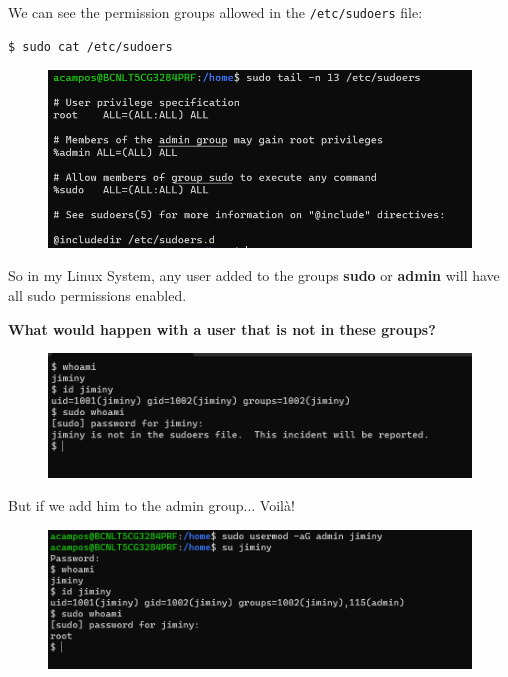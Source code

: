 \documentclass{article}
\newenvironment{codetemplate}[1][]{%
  \mybasecolorbox[#1]
  \itshape
}{%
  \endmybasecolorbox
}
\begin{document}
We can see the permission groups allowed in the \verb|/etc/sudoers| file:

\begin{codetemplate}{}
\begin{verbatim}
$ sudo cat /etc/sudoers
\end{verbatim}
\end{codetemplate}

\begin{figure}[H]
    \includegraphics[width=\textwidth]{pictures/sudoers.png}
    \centering
\end{figure}

So in my Linux System, any user added to the groups \textbf{sudo} or \textbf{admin} will have all sudo permissions enabled.

\textbf{What would happen with a user that is not in these groups?}
\begin{figure}[H]
    \includegraphics[width=\textwidth]{pictures/jiminy.png}
    \centering
\end{figure}

But if we add him to the admin group... Voilà!
\begin{figure}[H]
    \includegraphics[width=\textwidth]{pictures/voliajiminy.png}
    \centering
\end{figure}
\end{document}
